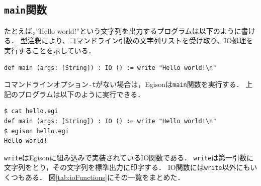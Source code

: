 \subsection{\texttt{main}関数}

たとえば，''Hello world!''という文字列を出力するプログラムは以下のように書ける．
型注釈により、コマンドライン引数の文字列リストを受け取り、IO処理を実行することを示している．
\begin{lstlisting}[language=egison,numbers=none]
def main (args: [String]) : IO () := write "Hello world!\n"
\end{lstlisting}
コマンドラインオプション\lstinline{-t}がない場合は，Egisonは\lstinline{main}関数を実行する．
上記のプログラムは以下のように実行できる．
\begin{lstlisting}[language=egison,numbers=none]
$ cat hello.egi
def main (args: [String]) : IO () := write "Hello world!\n"
$ egison hello.egi
Hello world!
\end{lstlisting}
\lstinline{write}はEgisonに組み込みで実装されているIO関数である．
\lstinline{write}は第一引数に文字列をとり，その文字列を標準出力に印字する．
IO関数には\lstinline{write}以外にもいくつもある．
図\ref{tab:ioFunctions}にその一覧をまとめた．

